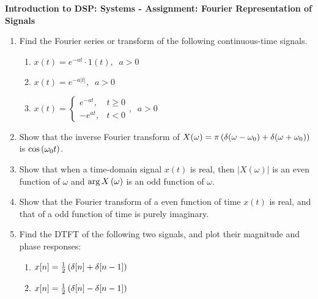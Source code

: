 \documentclass[9pt]{article}
\def\lp{\ensuremath\left(}
\def\rp{\ensuremath\right)}
\begin{document}
\begin{center}
    \begin{Large}
        \textbf{Introduction to DSP: Systems - Assignment: Fourier Representation of Signals}
    \end{Large}
\end{center}
\vspace{0.2cm}

\begin{multicols}{2}
    \begin{enumerate}
        \item Find the Fourier series or transform of the following continuous-time signals.
        \begin{enumerate}
            \item $x(t) = e^{-at} \cdot 1(t), \,\,\ a > 0$
            \item $x(t) = e^{-a\vert t \vert}, \,\,\ a > 0$
            \item $x(t) = \begin{cases} e^{-a t}, & t \geq 0 \\ -e^{a t}, & t < 0 \end{cases}, \,\,\ a > 0$
        \end{enumerate}

        \item Show that the inverse Fourier transform of $X(\omega) = \pi \lp \delta(\omega - \omega_0) + \delta(\omega + \omega_0)\rp$ is $\cos\lp \omega_0 t \rp$.

        \item Show that when a time-domain signal $x(t)$ is real, then $\vert X(\omega) \vert$ is an even function of $\omega$ and $\arg X\lp \omega \rp$ is an odd function of $\omega$.

        \item Show that the Fourier transform of a even function of time $x(t)$ is real, and that of a odd function of time is purely imaginary.

        \item Find the DTFT of the following two signals, and plot their magnitude and phase responses:
        \begin{enumerate}
            \item $x[n] = \frac{1}{2} \lp \delta[n] + \delta[n-1] \rp$
            \item $x[n] = \frac{1}{2} \lp \delta[n] - \delta[n-1] \rp$
        \end{enumerate}
    \end{enumerate}
    \vfill
\end{multicols}
\end{document}
